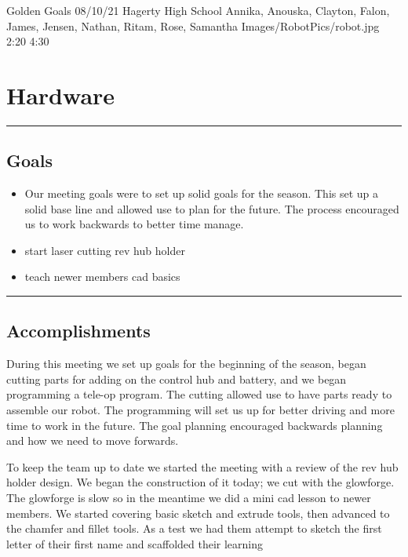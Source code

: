 \insertmeeting 
	{Golden Goals} 
	{08/10/21}
	{Hagerty High School}
	{Annika, Anouska, Clayton, Falon, James, Jensen, Nathan, Ritam, Rose, Samantha}
	{Images/RobotPics/robot.jpg}
	{2:20}
  {4:30}
	
\section*{Hardware}
\noindent\hfil\rule{\textwidth}{.4pt}\hfil
\subsection*{Goals}
\begin{itemize}
    \item Our meeting goals were to set up solid goals for the season. This set up a solid base line and allowed use to plan for the future. The process encouraged us to work backwards to better time manage. 
    \item start laser cutting rev hub holder
	\item teach newer members cad basics

\end{itemize} 

\noindent\hfil\rule{\textwidth}{.4pt}\hfil

\subsection*{Accomplishments}
During this meeting we set up goals for the beginning of the season, began cutting parts for adding on the control hub and battery, and we began programming a tele-op program. The cutting allowed use to have parts ready to assemble our robot. The programming will set us up for better driving and more time to work in the future. The goal planning encouraged backwards planning and how we need to move forwards.

To keep the team up to date we started the meeting with a review of the rev hub holder design. We began the construction of it today; we cut with the glowforge. The glowforge is slow so in the meantime we did a mini cad lesson to newer members. We started covering basic sketch and extrude tools, then advanced to the chamfer and fillet tools. As a test we had them attempt to sketch the first letter of their first name and scaffolded their learning